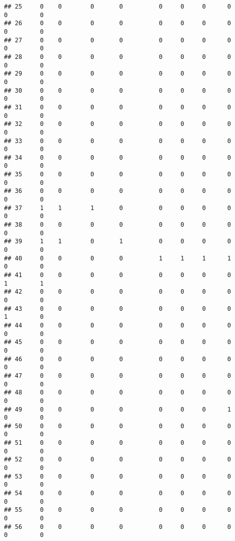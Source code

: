 \documentclass[
]{article}
\begin{document}
\begin{verbatim}
## 25     0    0        0       0          0     0     0      0       0         0
## 26     0    0        0       0          0     0     0      0       0         0
## 27     0    0        0       0          0     0     0      0       0         0
## 28     0    0        0       0          0     0     0      0       0         0
## 29     0    0        0       0          0     0     0      0       0         0
## 30     0    0        0       0          0     0     0      0       0         0
## 31     0    0        0       0          0     0     0      0       0         0
## 32     0    0        0       0          0     0     0      0       0         0
## 33     0    0        0       0          0     0     0      0       0         0
## 34     0    0        0       0          0     0     0      0       0         0
## 35     0    0        0       0          0     0     0      0       0         0
## 36     0    0        0       0          0     0     0      0       0         0
## 37     1    1        1       0          0     0     0      0       0         0
## 38     0    0        0       0          0     0     0      0       0         0
## 39     1    1        0       1          0     0     0      0       0         0
## 40     0    0        0       0          1     1     1      1       0         0
## 41     0    0        0       0          0     0     0      0       1         1
## 42     0    0        0       0          0     0     0      0       0         0
## 43     0    0        0       0          0     0     0      0       1         0
## 44     0    0        0       0          0     0     0      0       0         0
## 45     0    0        0       0          0     0     0      0       0         0
## 46     0    0        0       0          0     0     0      0       0         0
## 47     0    0        0       0          0     0     0      0       0         0
## 48     0    0        0       0          0     0     0      0       0         0
## 49     0    0        0       0          0     0     0      1       0         0
## 50     0    0        0       0          0     0     0      0       0         0
## 51     0    0        0       0          0     0     0      0       0         0
## 52     0    0        0       0          0     0     0      0       0         0
## 53     0    0        0       0          0     0     0      0       0         0
## 54     0    0        0       0          0     0     0      0       0         0
## 55     0    0        0       0          0     0     0      0       0         0
## 56     0    0        0       0          0     0     0      0       0         0

\end{verbatim}
\end{document}
